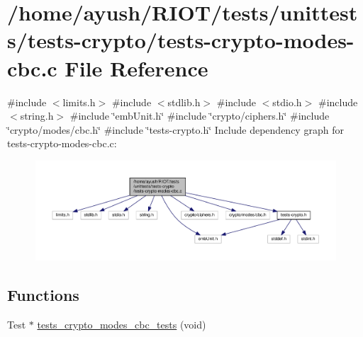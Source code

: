 \hypertarget{tests-crypto-modes-cbc_8c}{}\section{/home/ayush/\+R\+I\+O\+T/tests/unittests/tests-\/crypto/tests-\/crypto-\/modes-\/cbc.c File Reference}
\label{tests-crypto-modes-cbc_8c}
{\ttfamily \#include $<$limits.\+h$>$}\newline
{\ttfamily \#include $<$stdlib.\+h$>$}\newline
{\ttfamily \#include $<$stdio.\+h$>$}\newline
{\ttfamily \#include $<$string.\+h$>$}\newline
{\ttfamily \#include \char`\"{}emb\+Unit.\+h\char`\"{}}\newline
{\ttfamily \#include \char`\"{}crypto/ciphers.\+h\char`\"{}}\newline
{\ttfamily \#include \char`\"{}crypto/modes/cbc.\+h\char`\"{}}\newline
{\ttfamily \#include \char`\"{}tests-\/crypto.\+h\char`\"{}}\newline
Include dependency graph for tests-\/crypto-\/modes-\/cbc.c\+:
\nopagebreak
\begin{figure}[H]
\begin{center}
\leavevmode
\includegraphics[width=350pt]{tests-crypto-modes-cbc_8c__incl}
\end{center}
\end{figure}
\subsection*{Functions}
\begin{DoxyCompactItemize}
\item 
Test $\ast$ \hyperlink{group__unittests_gada776e0b50a5f95f2f3eb86d94d83791}{tests\+\_\+crypto\+\_\+modes\+\_\+cbc\+\_\+tests} (void)
\end{DoxyCompactItemize}
